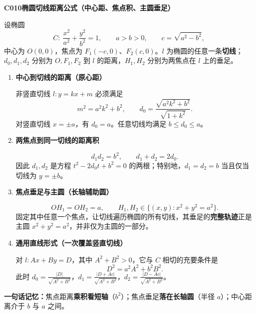 \begin{statementbox}
\textbf{C010\quad 椭圆切线距离公式（中心距、焦点积、主圆垂足）}

设椭圆
\[
C:\ \frac{x^2}{a^2}+\frac{y^2}{b^2}=1,\qquad a>b>0,
\qquad c=\sqrt{a^2-b^2},
\]
中心为 $O(0,0)$，焦点为 $F_1(-c,0)$、$F_2(c,0)$。$l$ 为椭圆的任意一条\textbf{切线}；$d_0,d_1,d_2$ 分别为 $O,F_1,F_2$ 到 $l$ 的距离，$H_1,H_2$ 分别为两焦点在 $l$ 上的垂足。

\begin{enumerate}
\item \textbf{中心到切线的距离（原心距）}\par
非竖直切线 $l:y=kx+m$ 必须满足
\[
m^2=a^2k^2+b^2,\qquad
\boxed{d_0=\frac{\sqrt{a^2k^2+b^2}}{\sqrt{1+k^2}}}.
\]
对竖直切线 $x=\pm a$，有 $d_0=a$。任意切线均满足 $\boxed{b\le d_0\le a}$。

\item \textbf{两焦点到同一切线的距离积}\par
\[
\boxed{d_1d_2=b^2},\qquad
\boxed{d_1+d_2=2d_0}.
\]
因此 $d_1,d_2$ 是方程 $t^2-2d_0t+b^2=0$ 的两根；特别地，$d_1=d_2=b$ 当且仅当切线为 $y=\pm b$。

\item \textbf{焦点垂足与主圆（长轴辅助圆）}\par
\[
\boxed{OH_1=OH_2=a},\qquad
\boxed{H_1,H_2\in\{(x,y):x^2+y^2=a^2\}}.
\]
固定其中任意一个焦点，让切线遍历椭圆的所有切线，其垂足的\textbf{完整轨迹}正是主圆 $x^2+y^2=a^2$，并非仅为主圆的一部分。

\item \textbf{通用直线形式（一次覆盖竖直切线）}\par
对 $l:Ax+By=D$，其中 $A^2+B^2>0$，它与 $C$ 相切的充要条件是
\[
\boxed{D^2=a^2A^2+b^2B^2}.
\]
此时 $d_0=\frac{|D|}{\sqrt{A^2+B^2}}$，$d_1=\frac{|D+Ac|}{\sqrt{A^2+B^2}}$，$d_2=\frac{|D-Ac|}{\sqrt{A^2+B^2}}$。
\end{enumerate}

\textbf{一句话记忆：}焦点距离\textbf{乘积看短轴}（$b^2$）；焦点垂足\textbf{落在长轴圆}（半径 $a$）；中心距离介于 $b$ 与 $a$ 之间。
\end{statementbox}
